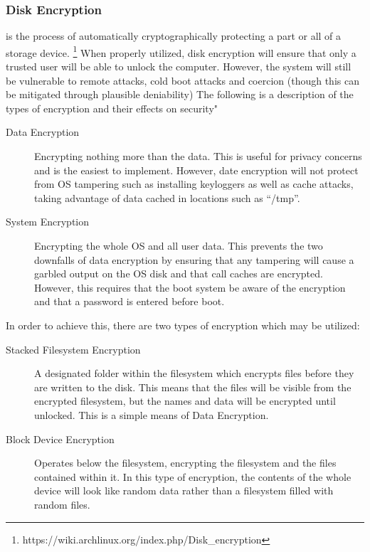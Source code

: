 \documentclass[a4paper,11pt]{report}
\begin{document}
		\subsubsection{Disk Encryption}
			is the process of automatically cryptographically protecting a part or all of a storage device.
			\footnote{https://wiki.archlinux.org/index.php/Disk\_encryption}
			When properly utilized, disk encryption will ensure that only a trusted user will be able to unlock the computer. 
			However, the system will still be vulnerable to remote attacks, cold boot attacks and coercion (though this can be mitigated through plausible deniability)
			The following is a description of the types of encryption and their effects on security"
			\begin{description}
				\item[Data Encryption] Encrypting nothing more than the data. 
					This is useful for privacy concerns and is the easiest to implement. 
					However, date encryption will not protect from OS tampering such as installing keyloggers as well as cache attacks, taking advantage of data cached in locations such as ``/tmp''.
				\item[System Encryption] Encrypting the whole OS and all user data. 
					This prevents the two downfalls of data encryption by ensuring that any tampering will cause a garbled output on the OS disk and that call caches are encrypted. 
					However, this requires that the boot system be aware of the encryption and that a password is entered before boot. 
			\end{description}
			In order to achieve this, there are two types of encryption which may be utilized:
			\begin{description}
				\item[Stacked Filesystem Encryption] A designated folder within the filesystem which encrypts files before they are written to the disk. 
					This means that the files will be visible from the encrypted filesystem, but the names and data will be encrypted until unlocked. 
					This is a simple means of Data Encryption. 
				\item[Block Device Encryption] Operates below the filesystem, encrypting the filesystem and the files contained within it. 
					In this type of encryption, the contents of the whole device will look like random data rather than a filesystem filled with random files. 
			\end{description}
\end{document}

